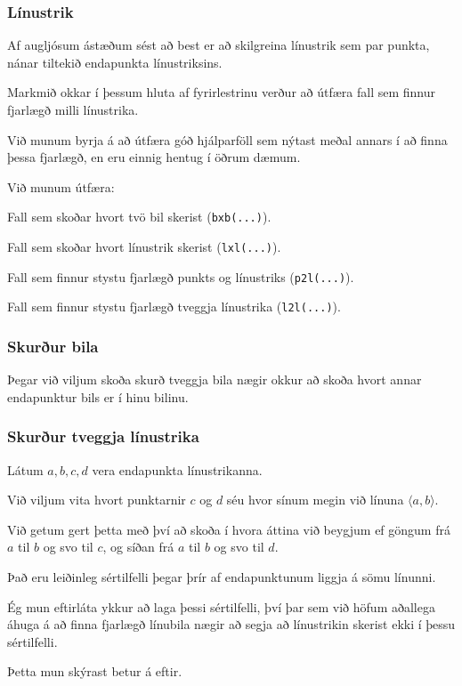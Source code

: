 \fi

{
	\frametitle{Línustrik}
	{
		\item<1-> Af augljósum ástæðum sést að best er að skilgreina línustrik sem par punkta, nánar tiltekið endapunkta línustriksins.
		\item<2-> Markmið okkar í þessum hluta af fyrirlestrinu verður að útfæra fall sem finnur fjarlægð milli línustrika.
		\item<3-> Við munum byrja á að útfæra góð hjálparföll sem nýtast meðal annars í að finna þessa fjarlægð, en eru einnig
			hentug í öðrum dæmum.
	}
}

{
	{
		\item<1-> Við munum útfæra:
		{
			\item<2-> Fall sem skoðar hvort tvö bil skerist (\texttt{bxb(...)}).
			\item<3-> Fall sem skoðar hvort línustrik skerist (\texttt{lxl(...)}).
			\item<4-> Fall sem finnur stystu fjarlægð punkts og línustriks (\texttt{p2l(...)}).
			\item<5-> Fall sem finnur stystu fjarlægð tveggja línustrika (\texttt{l2l(...)}).
		}
	}
}

{
	\frametitle{Skurður bila}
	{
		\item<1-> Þegar við viljum skoða skurð tveggja bila nægir okkur að skoða hvort annar endapunktur bils er í hinu bilinu.
		\item<2->[] 
	}
}

{
	\frametitle{Skurður tveggja línustrika}
	{
		\item<1-> Látum $a, b, c, d$ vera endapunkta línustrikanna.
		\item<2-> Við viljum vita hvort punktarnir $c$ og $d$ séu hvor sínum megin við línuna $\langle a, b \rangle$.
		\item<3-> Við getum gert þetta með því að skoða í hvora áttina við beygjum ef göngum frá $a$ til $b$ og svo til $c$,
					og síðan frá $a$ til $b$ og svo til $d$.
	}
}

{
	{
		\item<1-> Það eru leiðinleg sértilfelli þegar þrír af endapunktunum liggja á sömu línunni.
		\item<2-> Ég mun eftirláta ykkur að laga þessi sértilfelli, því þar sem við höfum aðallega
			áhuga á að finna fjarlægð línubila nægir að segja að línustrikin skerist ekki í þessu sértilfelli.
		\item<3-> Þetta mun skýrast betur á eftir.
	}
}

